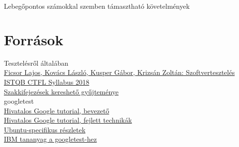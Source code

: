 \documentclass[usenames,dvipsnames,aspectratio=169]{beamer}
\newcommand{\hiv}[1]{{\color{hivatkozasszin}#1}}
\begin{document}
\begin{frame}
  \begin{center}
    Lebegőpontos számokkal szemben támasztható követelmények
    \medskip\\
  \end{center}
\end{frame}


\section{Források}

\begin{frame}
  Tesztelésről általában\\
  \hiv{\href{https://www.tankonyvtar.hu/hu/tartalom/tamop425/0046\_szoftverteszteles/index.html}%
  {Ficsor Lajos, Kovács László, Kusper Gábor, Krizsán Zoltán: Szoftvertesztelés}}\\
  \hiv{\href{https://hstqb.org/downloadarea/istqb-ctfl-syllabus-2018-magyar/}{ISTQB CTFL Syllabus 2018}}\\
  \hiv{\href{https://glossary.istqb.org/en/search/}{Szakkifejezések kereshető gyűjteménye}}\\
  \vfill
  googletest\\
  \hiv{\href{https://github.com/google/googletest/blob/master/googletest/docs/primer.md}%
    {Hivatalos Google tutorial, bevezető}}\\
  \hiv{\href{https://github.com/google/googletest/blob/master/googletest/docs/advanced.md}%
    {Hivatalos Google tutorial, fejlett technikák}}\\
  \hiv{\href{https://www.eriksmistad.no/getting-started-with-google-test-on-ubuntu/}%
    {Ubuntu-specifikus részletek}}\\
  \hiv{\href{https://developer.ibm.com/articles/au-googletestingframework/}{IBM tananyag a googletest-hez}}\\
\end{frame}
\end{document}
